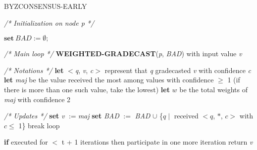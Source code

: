 \documentclass[conference]{IEEEtran}
\begin{document}
\begin{algorithm}
\caption{BYZCONSENSUS-EARLY}\label{euclid}
\textit{/* Initialization on node p */}
\begin{algorithmic}[1]
\STATE $\textbf{set} ~\textit{BAD} := \emptyset;$
\item[]
\item[]
\textit{/* Main loop */}
\STATE \textbf{WEIGHTED-GRADECAST}(\textit{p}, \textit{BAD}) with input value \textit{v}
\item[]
\item[]
\textit{/* Notations */}
\STATE \textbf{let} $<$\textit{q}, \textit{v}, \textit{c}$>$ represent that \textit{q} gradecasted \textit{v} with confidence \textit{c}
\STATE \textbf{let} \textit{maj} be the value received the most among values with confidence $\geq$ 1
(if there is more than one such value, take the lowest)
\STATE \textbf{let} $w$ be the total weights of \textit{maj} with confidence 2
\item[]
\item[]
\textit{/* Updates */}
\STATE \textbf{set} \textit{v} $:=$\textit{maj}
\STATE \textbf{set} \textit{BAD} $:=$ \textit{BAD} $\cup$ \{$q \mid$ received $<q$, $\ast$, $c>$ with $c \leq$ 1\}
\STATE break loop
\ENDIF
\ENDFOR
\item[]
\STATE \textbf{if} executed for $<$ t + 1 iterations then participate in one more iteration
\STATE return \textit{v}

\end{algorithmic}
\end{algorithm}
\end{document}
